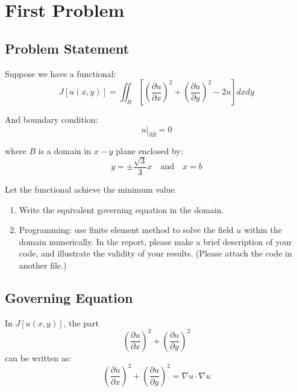 \section{First Problem}

\subsection{Problem Statement}

Suppose we have a functional:
\begin{equation}
    J[u(x,y)]=
    \iint_B
    \left[
        \left(
            \frac{\partial u}{\partial x}
        \right)^2+
        \left(
            \frac{\partial u}{\partial y}
        \right)^2 - 2u
    \right]dxdy
\end{equation}

And boundary condition:
\begin{equation}
    u|_{\partial B} = 0
\end{equation}

where $B$ is a domain in $x-y$ plane enclosed by:
\begin{equation}
    y=\pm \frac{\sqrt{3}}{3}x\quad\text{and}
    \quad x=b
\end{equation}

Let the functional achieve the minimum value.

\begin{enumerate}[(1)]
    \item Write the equivalent governing equation in the domain.
    \item Programming: use finite element method to solve the field $u$ within the domain 
    numerically. In the report, please make a brief description of your code, and illustrate 
    the validity of your results. (Please attach the code in another file.)
\end{enumerate}

\subsection{Governing Equation}

In $J[u(x,y)]$, the part
$$
    \left(
            \frac{\partial u}{\partial x}
        \right)^2+
        \left(
            \frac{\partial u}{\partial y}
        \right)^2
$$
can be written as:
\begin{equation}
    \left(
            \frac{\partial u}{\partial x}
        \right)^2+
        \left(
            \frac{\partial u}{\partial y}
        \right)^2
        =\nabla u\cdot \nabla u
\end{equation}

